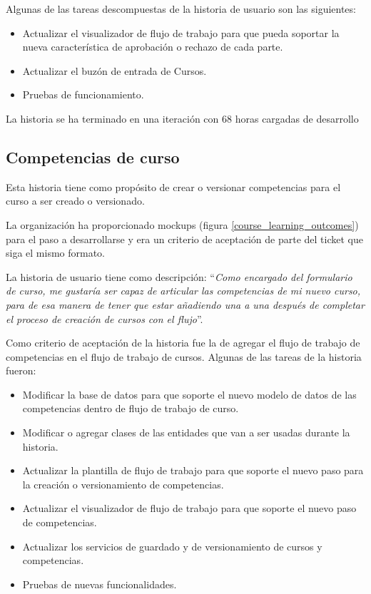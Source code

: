 Algunas de las tareas descompuestas de la historia de usuario son las siguientes:
\begin{itemize}
	\item Actualizar el visualizador de flujo de trabajo para que pueda soportar la nueva característica de aprobación o rechazo de cada parte.
	\item Actualizar el buzón de entrada de Cursos.
	\item Pruebas de funcionamiento.
\end{itemize}

La historia se ha terminado en una iteración con 68 horas cargadas de desarrollo

\subsection{Competencias de curso}
Esta historia tiene como propósito de crear o versionar competencias para el curso a ser creado o versionado. 

La organización ha proporcionado mockups (figura \ref{course_learning_outcomes}) para el paso a desarrollarse y era un criterio de aceptación de parte del ticket que siga el mismo formato.

La historia de usuario tiene como descripción: \enquote{\textit{Como encargado del formulario de curso, me gustaría ser capaz de articular las competencias de mi nuevo curso, para de esa manera de tener que estar añadiendo una a una después de completar el proceso de creación de cursos con el flujo}}.

Como criterio de aceptación de la historia fue la de agregar el flujo de trabajo de competencias en el flujo de trabajo de cursos. Algunas de las tareas de la historia fueron:
\begin{itemize}
	\item Modificar la base de datos para que soporte el nuevo modelo de datos de las competencias dentro de flujo de trabajo de curso.
	\item Modificar o agregar clases de las entidades que van a ser usadas durante la historia.
	\item Actualizar la plantilla de flujo de trabajo para que soporte el nuevo paso para la creación o versionamiento de competencias.
	\item Actualizar el visualizador de flujo de trabajo para que soporte el nuevo paso de competencias.
	\item Actualizar los servicios de guardado y de versionamiento de cursos y competencias.
	\item Pruebas de nuevas funcionalidades.
\end{itemize}

